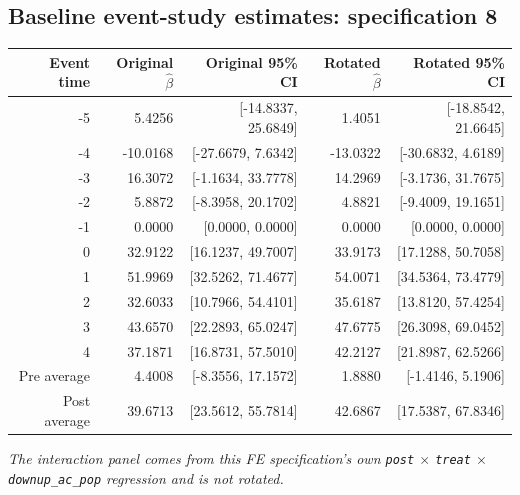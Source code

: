 \documentclass[10pt]{article}
\begin{document}
\subsection*{Baseline event-study estimates: specification 8}
\begin{center}
\scriptsize
\begin{tabular}{r rr rr}
\toprule
Event time & Original $\hat\beta$ & Original 95\% CI & Rotated $\hat\beta$ & Rotated 95\% CI \\
\midrule
-5 & 5.4256 & [-14.8337, 25.6849] & 1.4051 & [-18.8542, 21.6645] \\
-4 & -10.0168 & [-27.6679, 7.6342] & -13.0322 & [-30.6832, 4.6189] \\
-3 & 16.3072 & [-1.1634, 33.7778] & 14.2969 & [-3.1736, 31.7675] \\
-2 & 5.8872 & [-8.3958, 20.1702] & 4.8821 & [-9.4009, 19.1651] \\
-1 & 0.0000 & [0.0000, 0.0000] & 0.0000 & [0.0000, 0.0000] \\
0 & 32.9122 & [16.1237, 49.7007] & 33.9173 & [17.1288, 50.7058] \\
1 & 51.9969 & [32.5262, 71.4677] & 54.0071 & [34.5364, 73.4779] \\
2 & 32.6033 & [10.7966, 54.4101] & 35.6187 & [13.8120, 57.4254] \\
3 & 43.6570 & [22.2893, 65.0247] & 47.6775 & [26.3098, 69.0452] \\
4 & 37.1871 & [16.8731, 57.5010] & 42.2127 & [21.8987, 62.5266] \\
\midrule
Pre average & 4.4008 & [-8.3556, 17.1572] & 1.8880 & [-1.4146, 5.1906] \\
Post average & 39.6713 & [23.5612, 55.7814] & 42.6867 & [17.5387, 67.8346] \\
\bottomrule
\end{tabular}
\end{center}
\medskip
\textit{The interaction panel comes from this FE specification's own \texttt{post} $\times$ \texttt{treat} $\times$ \texttt{downup\_ac\_pop} regression and is not rotated.}
\clearpage
\end{document}
